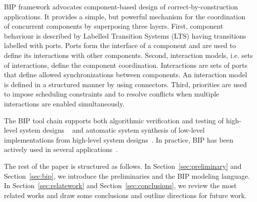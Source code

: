 BIP framework advocates component-based design of correct-by-construction applications.
It provides a simple, but powerful mechanism for the coordination of concurrent components by superposing three layers.
First, component behaviour is described by Labelled Transition Systems (LTS) having transitions labelled with ports.
Ports form the interface of a component and are used to define its interactions with other components.
Second, interaction models, i.e. sets of interactions, define the component coordination.
Interactions are sets of ports that define allowed synchronizations between components.
An interaction model is defined in a structured manner by using connectors.
Third, priorities are used to impose scheduling constraints and to resolve conflicts when multiple interactions are enabled simultaneously.


The BIP tool chain supports both algorithmic verification and testing of high-level system designs ~\cite{dfinder10,atva15,tgc15}
 and automatic system synthesis of low-level implementations from high-level system designs~\cite{bip-emsoft10}.
 In practice, BIP has been actively used in several applications~\cite{bipapplication12a,bipapplication18}.


The rest of the paper is structured as follows.
%
In Section~\ref{sec:preliminary} and Section~\ref{sec:bip}, we introduce the preliminaries and the BIP modeling language.
%
In Section~\ref{sec:relatework} and Section~\ref{sec:conclusions}, we review the most related works and draw some conclusions and outline directions for future work.

